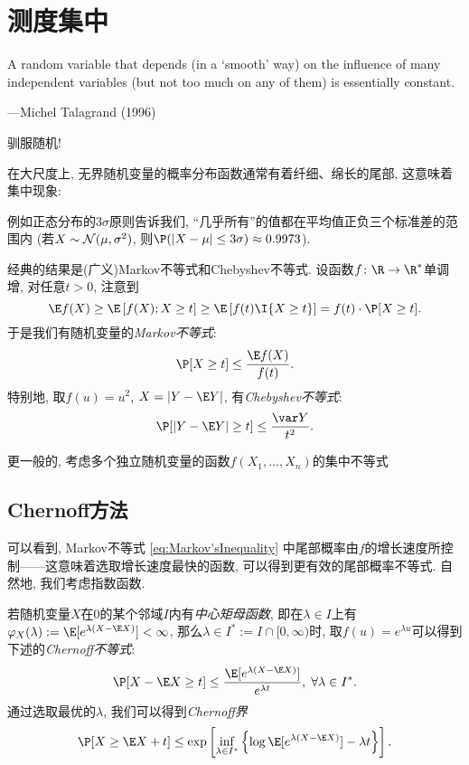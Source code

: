 \section{测度集中}

\epigraph{A random variable that depends (in a ‘smooth’ way) on the influence of many independent variables (but not too much on any of them) is essentially constant.}{---Michel Talagrand (1996)}

驯服随机! 

在大尺度上, 无界随机变量的概率分布函数通常有着纤细、绵长的尾部, 这意味着集中现象: 

例如正态分布的$3 \sigma$原则告诉我们, “几乎所有”的值都在平均值正负三个标准差的范围内 (若$X \sim \mathcal{N}(\mu, \sigma^2)$, 则$\P(|X - \mu| \leq 3 \sigma) \approx 0.9973$). 

经典的结果是(广义)Markov不等式和Chebyshev不等式.
设函数$f \colon \R \to \R^*$单调增, 对任意$t > 0$, 注意到
\begin{equation*}
	\E f(X) 
		\geq \E \left[f(X); X \geq t \right]
		\geq \E \left[f(t) \I{X \geq t} \right] 
		= f(t) \cdot \P[X \geq t].
\end{equation*}
于是我们有随机变量的\emph{Markov不等式}: 
\begin{equation}\label{eq:Markov'sInequality}
	\P[X \geq t] \leq \frac{\E f(X)}{f(t)}.
\end{equation}
特别地, 取$f(u) = u^2$, $X = |Y - \E Y|$, 有\emph{Chebyshev不等式}: 
\begin{equation*}
	\P[|Y - \E Y| \geq t] 
	\leq \frac{\var Y}{t^2}.
\end{equation*}

更一般的, 考虑多个独立随机变量的函数$f(X_1, \dots, X_n)$的集中不等式


\subsection{Chernoff方法}

可以看到, Markov不等式 \eqref{eq:Markov'sInequality} 中尾部概率由$f$的增长速度所控制——这意味着选取增长速度最快的函数, 可以得到更有效的尾部概率不等式. 
自然地, 我们考虑指数函数. 

若随机变量$X$在$0$的某个邻域$I$内有\emph{中心矩母函数}, 即在$\lambda \in I$上有$\varphi_X(\lambda) := \E[e^{\lambda (X - \E X)}] < \infty$, 那么$\lambda \in I^* := I \cap [0, \infty)$时, 取$f(u) = e^{\lambda u}$可以得到下述的\emph{Chernoff不等式}: 
\begin{equation*}
	\P[X - \E X \geq t] 
	\leq \frac{\E[e^{\lambda(X - \E X)}]}{e^{\lambda t}},\;
	\forall \lambda \in I^*.
\end{equation*}
通过选取最优的$\lambda$, 我们可以得到\emph{Chernoff界}
\begin{equation*}
	\P[X \geq \E X + t]
	\leq \exp \left[ \inf_{\lambda \in I^*} \left\{ \log \E[e^{\lambda(X - \E X)}] - \lambda t \right\} \right]. 
\end{equation*}

